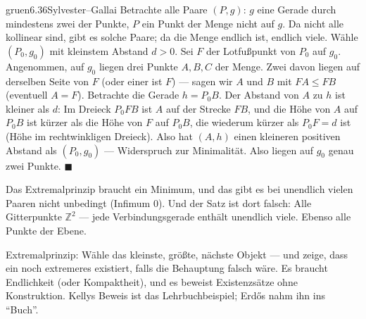 \begin{loesungkarte}{gruen}{6.36}{Sylvester--Gallai}
Betrachte alle Paare $(P, g)$: $g$ eine Gerade durch mindestens zwei der Punkte, $P$ ein Punkt der Menge nicht auf $g$. Da nicht alle kollinear sind, gibt es solche Paare; da die Menge endlich ist, endlich viele.
Wähle $(P_0, g_0)$ mit kleinstem Abstand $d > 0$. Sei $F$ der Lotfußpunkt von $P_0$ auf $g_0$.
Angenommen, auf $g_0$ liegen drei Punkte $A, B, C$ der Menge. Zwei davon liegen auf derselben Seite von $F$ (oder einer ist $F$) --- sagen wir $A$ und $B$ mit $FA\le FB$ (eventuell $A = F$). Betrachte die Gerade $h = P_0B$. Der Abstand von $A$ zu $h$ ist kleiner als $d$: Im Dreieck $P_0FB$ ist $A$ auf der Strecke $FB$, und die Höhe von $A$ auf $P_0B$ ist kürzer als die Höhe von $F$ auf $P_0B$, die wiederum kürzer als $P_0F = d$ ist (Höhe im rechtwinkligen Dreieck). Also hat $(A, h)$ einen kleineren positiven Abstand als $(P_0, g_0)$ --- Widerspruch zur Minimalität. Also liegen auf $g_0$ genau zwei Punkte. $\blacksquare$
\begin{center}
\end{center}
Das Extremalprinzip braucht ein Minimum, und das gibt es bei unendlich vielen Paaren nicht unbedingt (Infimum $0$). Und der Satz ist dort falsch: Alle Gitterpunkte $\mathbb Z^{2}$ --- jede Verbindungsgerade enthält unendlich viele. Ebenso alle Punkte der Ebene.
\begin{mitnehmen}\kastentext
Extremalprinzip: Wähle das kleinste, größte, nächste Objekt --- und zeige, dass ein noch extremeres existiert, falls die Behauptung falsch wäre. Es braucht Endlichkeit (oder Kompaktheit), und es beweist Existenzsätze ohne Konstruktion. Kellys Beweis ist das Lehrbuchbeispiel; Erdős nahm ihn ins \enquote{Buch}.
\end{mitnehmen}
\end{loesungkarte}


